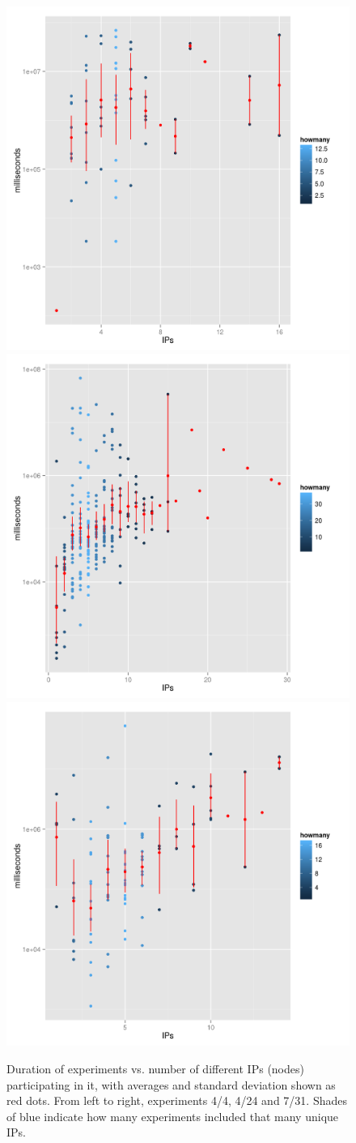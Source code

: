 \documentclass[journal,onecolumn]{IEEEtran}
\begin{document}
\begin{figure}[!htb]
\centering
\includegraphics[width=0.32\linewidth]{img/time-vs-ips-OS-4-4.png}
\includegraphics[width=0.32\linewidth]{img/time-vs-ips-OS-4-24.png}
\includegraphics[width=0.32\linewidth]{img/time-vs-ips-OS-7-31.png}
\caption{Duration of experiments vs. number of different IPs (nodes)
  participating in it, with averages and standard deviation shown as
  red dots. From left to right, experiments 4/4, 4/24 and 7/31. Shades
of blue indicate how many experiments included that many unique IPs.}
\label{fig:duration}
\end{figure}
%
\end{document}
